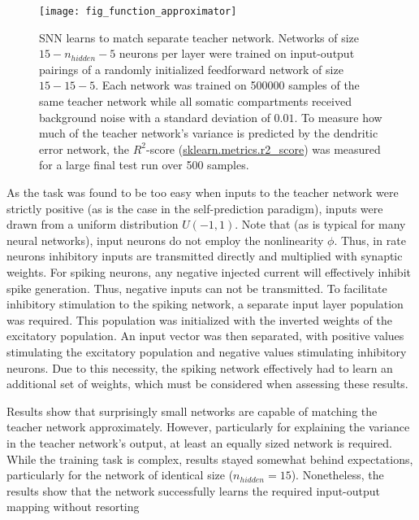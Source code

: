 \begin{figure}[h]
    \centering
    \texttt{[image: fig\_function\_approximator]}
    \caption[SNN learns to match separate teacher network.]{SNN learns to match separate teacher network. Networks of
    size $15-n_{hidden}-5$ neurons per layer were trained on input-output pairings of a randomly initialized feedforward
    network of size $15-15-5$. Each network was trained on 500000 samples of the same teacher network while all somatic
    compartments received background noise with a standard deviation of $0.01$. To measure how much of the teacher
    network's variance is predicted by the dendritic error network, the $R^2$-score
    (\href{https://scikit-learn.org/stable/modules/generated/sklearn.metrics.r2_score.html}{sklearn.metrics.r2\_score})
    was measured for a large final test run over 500 samples.}
    \label{fig-func-approx}
\end{figure}

As the task was found to be too easy when inputs to the teacher network were strictly positive (as is the case in the
self-prediction paradigm), inputs were drawn from a uniform distribution $U(-1,1)$. Note that (as is typical for many
neural networks), input neurons do not employ the nonlinearity $\phi$. Thus, in rate neurons inhibitory inputs are
transmitted directly and multiplied with synaptic weights. For spiking neurons, any negative injected current will
effectively inhibit spike generation. Thus, negative inputs can not be transmitted. To facilitate inhibitory stimulation
to the spiking network, a separate input layer population was required. This population was initialized with the
inverted weights of the excitatory population. An input vector was then separated, with positive values stimulating the
excitatory population and negative values stimulating inhibitory neurons. Due to this necessity, the spiking network
effectively had to learn an additional set of weights, which must be considered when assessing these results. 

Results show that surprisingly small networks are capable of matching the teacher network approximately. However,
particularly for explaining the variance in the teacher network's output, at least an equally sized network  is
required. While the training task is complex, results stayed somewhat behind expectations, particularly for the network
of identical size ($n_{hidden} = 15$). Nonetheless, the results show that the network successfully learns the required
input-output mapping without resorting 


